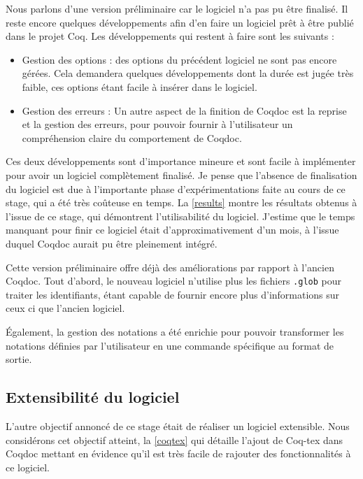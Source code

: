 \documentclass[a4paper, 11pt]{report}
\begin{document}
    Nous parlons d'une version préliminaire car le logiciel n'a pas pu être
    finalisé. Il reste encore quelques développements afin d'en faire un logiciel
    prêt à être publié dans le projet Coq. Les développements qui restent à faire
    sont les suivants :
    \begin{itemize}
      \item Gestion des options : des options du précédent logiciel ne
        sont pas encore gérées. Cela demandera quelques développements dont la
        durée est jugée très faible, ces options étant facile à insérer dans
        le logiciel.
      \item Gestion des erreurs : Un autre aspect de la finition de Coqdoc
        est la reprise et la gestion des erreurs, pour pouvoir fournir à
        l'utilisateur un compréhension claire du comportement de Coqdoc.
    \end{itemize}

    Ces deux développements sont d'importance mineure et sont facile à
    implémenter pour avoir un logiciel complètement finalisé.
    Je pense que l'absence de finalisation du logiciel est due à l'importante
    phase d'expérimentations faite au cours de ce stage, qui a été très
    coûteuse en temps. La \cref{results} montre les résultats obtenus à l'issue
    de ce stage, qui démontrent l'utilisabilité du logiciel. J'estime que le temps
    manquant pour finir ce logiciel était d'approximativement d'un mois, à
    l'issue duquel Coqdoc aurait pu être pleinement intégré.

    Cette version préliminaire offre déjà des améliorations par rapport à
    l'ancien Coqdoc. Tout d'abord, le nouveau logiciel n'utilise plus les
    fichiers \texttt{.glob} pour traiter les identifiants, étant capable de
    fournir encore plus d'informations sur ceux ci que l'ancien logiciel.

    Également, la gestion des notations a été enrichie pour pouvoir transformer
    les notations définies par l'utilisateur en une commande spécifique au
    format de sortie.

    \subsection{Extensibilité du logiciel}
    L'autre objectif annoncé de ce stage était de réaliser un logiciel
    extensible. Nous considérons cet objectif atteint, la \cref{coqtex}
    qui détaille l'ajout de Coq-tex dans Coqdoc mettant
    en évidence qu'il est très facile de rajouter des fonctionnalités à ce
    logiciel.
\end{document}
